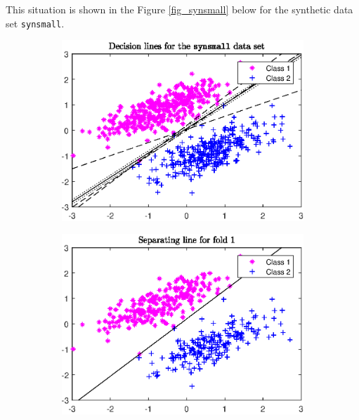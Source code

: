 This situation is shown in the Figure \ref{fig_synsmall} below for the synthetic data set \texttt{synsmall}.


\begin{figure}[ht]
	\begin{subfigure}[t]{0.49\textwidth}
		\includegraphics[width=\textwidth]{Pictures/Plots/plot_all_data_all_w.eps}
	\end{subfigure}%
	\hfill
	\begin{subfigure}[t]{0.49\textwidth}
			\includegraphics[width=\textwidth]{Pictures/Plots/Fold_1.eps}
	\end{subfigure}\\
	\begin{subfigure}[t]{0.49\textwidth}

\end{subfigure}
\end{figure}
